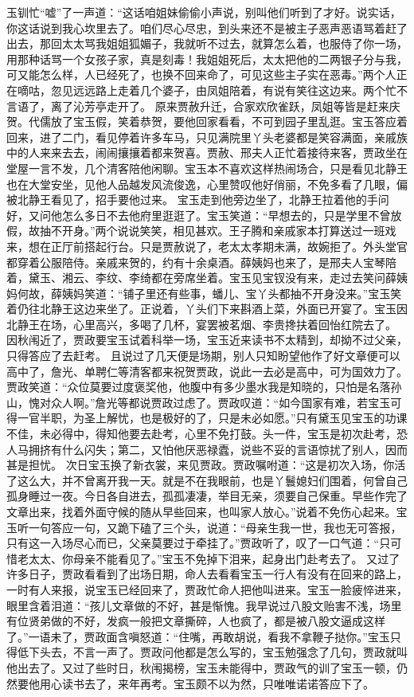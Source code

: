 \documentclass[12pt,oneside]{book}
\begin{document}
玉钏忙“嘘”了一声道：“这话咱姐妹偷偷小声说，别叫他们听到了才好。说实话，你这话说到我心坎里去了。咱们尽心尽忠，到头来还不是被主子恶声恶语骂着赶了出去，那回太太骂我姐姐狐媚子，我就听不过去，就算怎么着，也服侍了你一场，用那种话骂一个女孩子家，真是刻毒！我姐姐死后，太太把他的二两银子分与我，可又能怎么样，人已经死了，也换不回来命了，可见这些主子实在恶毒。”两个人正在嘀咕，忽见远远路上走着几个婆子，由凤姐陪着，有说有笑往这边来。两个忙不言语了，离了沁芳亭走开了。
原来贾赦升迁，合家欢欣雀跃，凤姐等皆是赶来庆贺。代儒放了宝玉假，笑着恭贺，要他回家看看，不可到园子里乱逛。宝玉答应着回来，进了二门，看见停着许多车马，只见满院里丫头老婆都是笑容满面，亲戚族中的人来来去去，闹闹攘攘着都来贺喜。贾赦、邢夫人正忙着接待来客，贾政坐在堂屋一言不发，几个清客陪他闲聊。宝玉本不喜欢这样热闹场合，只是看见北静王也在大堂安坐，见他人品越发风流俊逸，心里赞叹他好俏丽，不免多看了几眼，偏被北静王看见了，招手要他过来。
宝玉走到他旁边坐了，北静王拉着他的手问好，又问他怎么多日不去他府里逛逛了。宝玉笑道：“早想去的，只是学里不曾放假，故抽不开身。”两个说说笑笑，相见甚欢。王子腾和亲戚家本打算送过一班戏来，想在正厅前搭起行台。只是贾赦说了，老太太孝期未满，故婉拒了。外头堂官都穿着公服陪侍。亲戚来贺的，约有十余桌酒。薛姨妈也来了，是邢夫人宝琴陪着，黛玉、湘云、李纹、李绮都在旁席坐着。宝玉见宝钗没有来，走过去笑问薛姨妈何故，薛姨妈笑道：“铺子里还有些事，蟠儿、宝丫头都抽不开身没来。”宝玉笑着仍往北静王这边来坐了。正说着，丫头们下来斟酒上菜，外面已开宴了。宝玉因北静王在场，心里高兴，多喝了几杯，宴罢被茗烟、李贵搀扶着回怡红院去了。
因秋闱近了，贾政要宝玉试着科举一场，宝玉近来读书不太精到，却拗不过父亲，只得答应了去赶考。
且说过了几天便是场期，别人只知盼望他作了好文章便可以高中了，詹光、单聘仁等清客都来祝贺贾政，说此一去必是高中，可为国效力了。贾政笑道：“众位莫要过度褒奖他，他腹中有多少墨水我是知晓的，只怕是名落孙山，愧对众人啊。”詹光等都说贾政过虑了。贾政叹道：“如今国家有难，若宝玉可得一官半职，为圣上解忧，也是极好的了，只是未必如愿。”只有黛玉见宝玉的功课不佳，未必得中，得知他要去赴考，心里不免打鼓。头一件，宝玉是初次赴考，恐人马拥挤有什么闪失；第二，又怕他厌恶禄蠹，说些不妥的言语惊扰了别人，因而甚是担忧。
次日宝玉换了新衣裳，来见贾政。贾政嘱咐道：“这是初次入场，你活了这么大，并不曾离开我一天。就是不在我眼前，也是丫鬟媳妇们围着，何曾自己孤身睡过一夜。今日各自进去，孤孤凄凄，举目无亲，须要自己保重。早些作完了文章出来，找着外面守候的随从早些回来，也叫家人放心。”说着不免伤心起来。宝玉听一句答应一句，又跪下磕了三个头，说道：“母亲生我一世，我也无可答报，只有这一入场尽心而已，父亲莫要过于牵挂了。”贾政听了，叹了一口气道：“只可惜老太太、你母亲不能看见了。”宝玉不免掉下泪来，起身出门赴考去了。
又过了许多日子，贾政看看到了出场日期，命人去看看宝玉一行人有没有在回来的路上，一时有人来报，说宝玉已经回来了，贾政忙命人把他叫进来。宝玉一脸疲悴进来，眼里含着泪道：“孩儿文章做的不好，甚是惭愧。我早说过八股文贻害不浅，场里有位贤弟做的不好，发疯一般把文章撕碎，人也疯了，都是被八股文逼成这样了。”一语未了，贾政面含嗔怒道：“住嘴，再敢胡说，看我不拿鞭子挞你。”宝玉只得低下头去，不言一声了。贾政问他都是怎么写的，宝玉勉强念了几句，贾政就叫他出去了。又过了些时日，秋闱揭榜，宝玉未能得中，贾政气的训了宝玉一顿，仍然要他用心读书去了，来年再考。宝玉颇不以为然，只唯唯诺诺答应下了。
\end{document}
